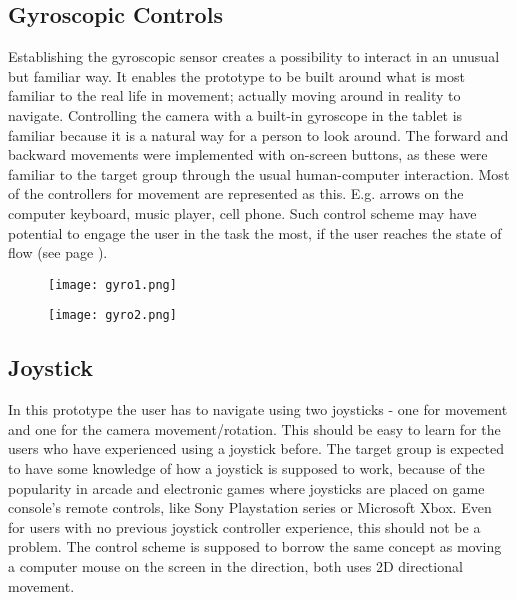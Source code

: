 \subsection{Gyroscopic Controls}
Establishing the gyroscopic sensor creates a possibility to interact in an unusual but familiar way. It enables the prototype to be built around what is most familiar to the real life in movement; actually moving around in reality to navigate.
Controlling the camera with a built-in gyroscope in the tablet is familiar because it is a natural way for a person to look around. The forward and backward movements were implemented with on-screen buttons, as these were familiar to the target group through the usual human-computer interaction. Most of the controllers for movement are represented as this. E.g. arrows on the computer keyboard, music player, cell phone.
Such control scheme may have potential to engage the user in the task the most, if the user reaches the state of flow (see page \pageref{FlowTheory}).

\begin{figure}[H]
\centering
\begin{minipage}{.5\textwidth}
  \centering
  \texttt{[image: gyro1.png]}
\end{minipage}%
\begin{minipage}{.5\textwidth}
  \centering
  \texttt{[image: gyro2.png]}
\end{minipage}
  \label{fig:gyroSketch}

\end{figure}


\subsection{Joystick}
In this prototype the user has to navigate using two joysticks - one for movement and one for the camera movement/rotation. This should be easy to learn for the users who have experienced using a joystick before. The target group is expected to have some knowledge of how a joystick is supposed to work, because of the popularity in arcade and electronic games where joysticks are placed on game console's remote controls, like Sony Playstation series or Microsoft Xbox. Even for users with no previous joystick controller experience, this should not be a problem. The control scheme is supposed to borrow the same concept as moving a computer mouse on the screen in the direction, both uses 2D directional movement.

